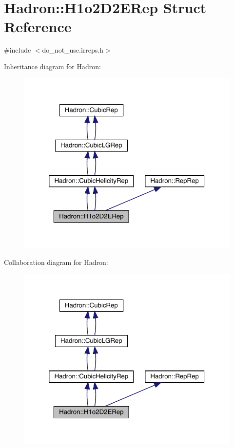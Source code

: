 \hypertarget{structHadron_1_1H1o2D2ERep}{}\section{Hadron\+:\+:H1o2\+D2\+E\+Rep Struct Reference}
\label{structHadron_1_1H1o2D2ERep}


{\ttfamily \#include $<$do\+\_\+not\+\_\+use.\+irreps.\+h$>$}



Inheritance diagram for Hadron\+:\nopagebreak
\begin{figure}[H]
\begin{center}
\leavevmode
\includegraphics[width=320pt]{db/d56/structHadron_1_1H1o2D2ERep__inherit__graph}
\end{center}
\end{figure}


Collaboration diagram for Hadron\+:\nopagebreak
\begin{figure}[H]
\begin{center}
\leavevmode
\includegraphics[width=320pt]{d4/db7/structHadron_1_1H1o2D2ERep__coll__graph}
\end{center}
\end{figure}
